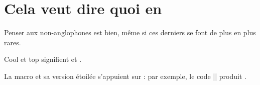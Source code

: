 

\usepackage[lang = french]{../main/main}
\usepackage{../macroenv/macroenv}
\usepackage{../listing/listing}
\usepackage{../rem-exa/rem-exa}


\usepackage{inenglish}




\section{Cela veut dire quoi en }

Penser aux non-anglophones est bien, même si ces derniers se font de plus en plus rares.

\begin{bdoclatex}
Cool et top signifient  et .
\end{bdoclatex}


La macro  et sa version étoilée s'appuient sur  : par exemple, le code \bdocinlatex|| produit .



